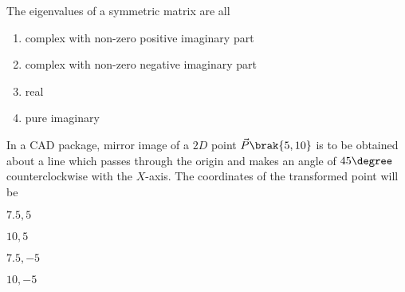 \item The eigenvalues of a symmetric matrix are all
\hfill{}
\begin{enumerate}
\item complex with non-zero positive imaginary part
\item complex with non-zero negative imaginary part
\item real
\item pure imaginary
\end{enumerate}
\item In a CAD package, mirror image of a $2D$ point $\vec{P}\brak{5,10}$ is to be obtained about a line which passes through the origin and makes an angle of $45\degree$ counterclockwise with the $X$-axis. The coordinates of the transformed point will be
\hfill{}
\begin{enumerate}
\begin{multicols}{4}
\item $7.5, 5$
\item $10, 5$
\item $7.5, -5$
\item $10, -5$
\end{multicols}
\end{enumerate}

